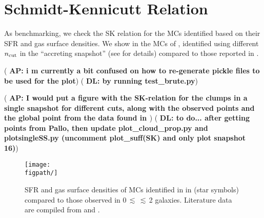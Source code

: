 \documentclass[iop]{emulateapj}
\newcommand{\AP}[1]{({\bf \color{apcolor} AP: #1})}
\newcommand{\DL}[1]{({\bf \color{dlcolor} DL: #1})}
\begin{document}





\appendix
\section{Schmidt-Kennicutt Relation}
As benchmarking, we check the SK relation for the MCs identified based on their SFR and gas surface densities.
We show in  the MCs of \flower, identified using different $n_{\rm cut}$ in the ``accreting snapshot'' 
(see  for details) compared to those reported in \obs. 

\AP{i m currently a bit confused on how to re-generate pickle files to be used for the plot}
\DL{by running test\_brute.py}

\AP{I would put a figure with the SK-relation for the clumps in a single snapshot for different cuts, along with the observed points and the global \flower point from the data found in \citet{Pallottini17a}}
\DL{to do... after getting points from Pallo, then update plot\_cloud\_prop.py and plotsingleSS.py (uncomment plot\_suff(SK) and only plot snapshot 16)}


\begin{figure*}[htbp]
\centering
\texttt{[image: \\figpath/]}
\caption{
SFR and gas surface densities of MCs identified in \flower in  (star symbols) compared to those 
observed in 0\,$\lesssim$\,\z$\lesssim$\,2 galaxies.
Literature data are compiled from \citealt{Kennicutt98a, Bouche07a, Daddi10a, Daddi10b, Genzel10a, Tacconi10a} and 
\citealt{Pallottini17b}.
\label{fig:sk}}
\end{figure*}




%

%
\end{document}
